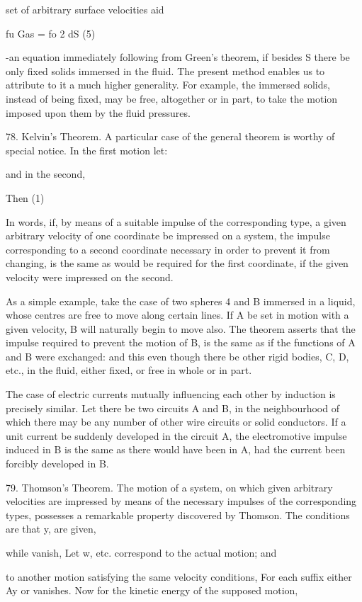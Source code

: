 set of arbitrary surface velocities aid

fu Gas = fo 2 dS (5)

-an equation immediately following from Green's theorem, if besides S there be
only fixed solids immersed in the fluid. The present method enables us to
attribute to it a much higher generality. For example, the immersed solids,
instead of being fixed, may be free, altogether or in part, to take the motion
imposed upon them by the fluid pressures.

78.  Kelvin’s Theorem.  A particular case of the general theorem is worthy of
special notice. In the first motion let:

and in the second,

Then (1)

In words, if, by means of a suitable impulse of the corresponding type, a given
arbitrary velocity of one coordinate be impressed on a system, the impulse
corresponding to a second coordinate necessary in order to prevent it from
changing, is the same as would be required for the first coordinate, if the
given velocity were impressed on the second.

As a simple example, take the case of two spheres 4 and B immersed in a liquid,
whose centres are free to move along certain lines. If A be set in motion with
a given velocity, B will naturally begin to move also.  The theorem asserts
that the impulse required to prevent the motion of B, is the same as if the
functions of A and B were exchanged: and this even though there be other rigid
bodies, C, D, etc., in the fluid, either fixed, or free in whole or in part.

The case of electric currents mutually influencing each other by induction is
precisely similar. Let there be two circuits A and B, in the neighbourhood of
which there may be any number of other wire circuits or solid conductors. If a
unit current be suddenly developed in the circuit A, the electromotive impulse
induced in B is the same as there would have been in A, had the current been
forcibly developed in B.

79.  Thomson's Theorem. The motion of a system, on which given arbitrary
velocities are impressed by means of the necessary impulses of the
corresponding types, possesses a remarkable property discovered by Thomson. The
conditions are that y, are given,

while vanish, Let w, etc. correspond to the actual motion; and

to another motion satisfying the same velocity conditions, For each suffix
either Ay or vanishes.  Now for the kinetic energy of the supposed motion,

